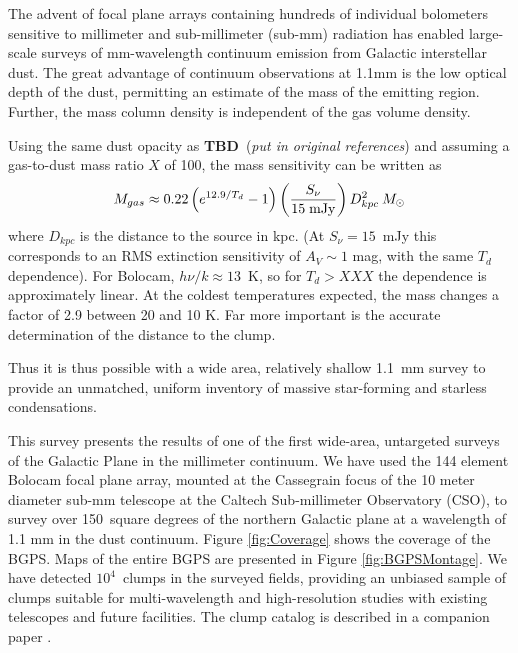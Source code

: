 \documentclass[12pt,preprint]{aastex}
\def\msol{\ifmmode {\>M_\odot}\else {$M_\odot$}\fi}
\def\bgps{BGPS}
\newcommand{\bgpsarea}{150}
\newcommand{\ncores}{$10^4$}
\newcommand{\TBD}{{\bf TBD}}
\begin{document}
The advent of focal plane arrays containing hundreds of individual
bolometers sensitive to millimeter and sub-millimeter (sub-mm)
radiation has enabled large-scale surveys of mm-wavelength continuum
emission from Galactic interstellar dust.  The great advantage of
continuum observations at 1.1mm is the low optical depth of the dust,
permitting an estimate of the mass of the emitting region.  Further,
the mass column density is independent of the gas volume density.

Using the same dust opacity as \TBD\ ({\it put in original references})
and assuming a gas-to-dust mass ratio $X$ of 100, the mass sensitivity
can be written as
\begin{equation} 
\label{eq:Mass}
M_{gas}\approx
0.22\left( e^{12.9/T_d}-1 \right) \left({S_\nu\over 15\; {\rm mJy}} \right)
D^{2}_{kpc} \msol 
\end{equation}
where $D_{kpc}$ is the distance to the source in kpc.  (At $S_\nu =
15$~mJy this corresponds to an RMS extinction sensitivity of $A_V\sim
1$ mag, with the same $T_d$ dependence).  For Bolocam, $h\nu/k \approx
13$~K, so for $T_d > XXX$ the dependence is approximately linear.  At
the coldest temperatures expected, the mass changes a factor of 2.9
between 20 and 10 K.  Far more important is the accurate determination
of the distance to the clump.

Thus it is thus possible with a wide area, relatively shallow 1.1~mm
survey to provide an unmatched, uniform inventory of massive
star-forming and starless condensations.

This survey presents the results of one of the first wide-area,
untargeted surveys of the Galactic Plane in the millimeter continuum.
We have used the 144 element Bolocam focal plane array, mounted at the
Cassegrain focus of the 10 meter diameter sub-mm telescope at the
Caltech Sub-millimeter Observatory (CSO), to survey over \bgpsarea\
square degrees of the northern Galactic plane at a wavelength of 1.1
mm in the dust continuum.  Figure \ref{fig:Coverage} shows the
coverage of the \bgps.  Maps of the entire BGPS are presented in
Figure \ref{fig:BGPSMontage}.  We have detected \ncores\ clumps in the
surveyed fields, providing an unbiased sample of clumps suitable for
multi-wavelength and high-resolution studies with existing telescopes
and future facilities.  The clump catalog is described in a companion
paper \citep{rosolowsky09}.

\end{document}
